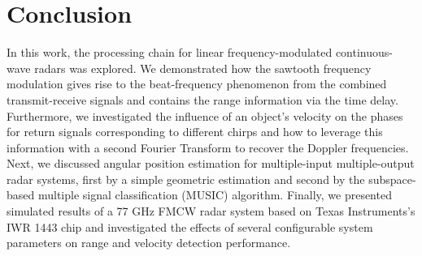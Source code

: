 \chapter{Conclusion}
In this work, the processing chain for linear frequency-modulated 
continuous-wave radars was explored. We demonstrated how the sawtooth frequency modulation
gives rise to the beat-frequency phenomenon from the combined transmit-receive
signals and contains the range information via the time delay. Furthermore, we
investigated the influence of an object's velocity on the phases for return
signals corresponding to different chirps and how to leverage this information
with a second Fourier Transform to recover the Doppler frequencies. Next, we
discussed angular position estimation for multiple-input multiple-output radar
systems, first by a simple geometric estimation and second by the
subspace-based multiple signal classification (MUSIC) algorithm. Finally, we
presented simulated results of a 77 GHz FMCW radar system based on Texas Instruments's
IWR 1443 chip and investigated the effects of several configurable system
parameters on range and velocity detection performance.
